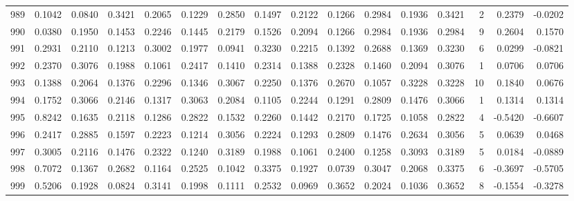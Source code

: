 \begin{tabular}{lrrrrrrrrrrrrrrr}
989 &      0.1042 &  0.0840 &  0.3421 &  0.2065 &  0.1229 &  0.2850 &  0.1497 &  0.2122 &  0.1266 &  0.2984 &   0.1936 &     0.3421 &      2 &                    0.2379 &                    -0.0202 \\
990 &      0.0380 &  0.1950 &  0.1453 &  0.2246 &  0.1445 &  0.2179 &  0.1526 &  0.2094 &  0.1266 &  0.2984 &   0.1936 &     0.2984 &      9 &                    0.2604 &                     0.1570 \\
991 &      0.2931 &  0.2110 &  0.1213 &  0.3002 &  0.1977 &  0.0941 &  0.3230 &  0.2215 &  0.1392 &  0.2688 &   0.1369 &     0.3230 &      6 &                    0.0299 &                    -0.0821 \\
992 &      0.2370 &  0.3076 &  0.1988 &  0.1061 &  0.2417 &  0.1410 &  0.2314 &  0.1388 &  0.2328 &  0.1460 &   0.2094 &     0.3076 &      1 &                    0.0706 &                     0.0706 \\
993 &      0.1388 &  0.2064 &  0.1376 &  0.2296 &  0.1346 &  0.3067 &  0.2250 &  0.1376 &  0.2670 &  0.1057 &   0.3228 &     0.3228 &     10 &                    0.1840 &                     0.0676 \\
994 &      0.1752 &  0.3066 &  0.2146 &  0.1317 &  0.3063 &  0.2084 &  0.1105 &  0.2244 &  0.1291 &  0.2809 &   0.1476 &     0.3066 &      1 &                    0.1314 &                     0.1314 \\
995 &      0.8242 &  0.1635 &  0.2118 &  0.1286 &  0.2822 &  0.1532 &  0.2260 &  0.1442 &  0.2170 &  0.1725 &   0.1058 &     0.2822 &      4 &                   -0.5420 &                    -0.6607 \\
996 &      0.2417 &  0.2885 &  0.1597 &  0.2223 &  0.1214 &  0.3056 &  0.2224 &  0.1293 &  0.2809 &  0.1476 &   0.2634 &     0.3056 &      5 &                    0.0639 &                     0.0468 \\
997 &      0.3005 &  0.2116 &  0.1476 &  0.2322 &  0.1240 &  0.3189 &  0.1988 &  0.1061 &  0.2400 &  0.1258 &   0.3093 &     0.3189 &      5 &                    0.0184 &                    -0.0889 \\
998 &      0.7072 &  0.1367 &  0.2682 &  0.1164 &  0.2525 &  0.1042 &  0.3375 &  0.1927 &  0.0739 &  0.3047 &   0.2068 &     0.3375 &      6 &                   -0.3697 &                    -0.5705 \\
999 &      0.5206 &  0.1928 &  0.0824 &  0.3141 &  0.1998 &  0.1111 &  0.2532 &  0.0969 &  0.3652 &  0.2024 &   0.1036 &     0.3652 &      8 &                   -0.1554 &                    -0.3278 \\
\bottomrule
\end{tabular}
